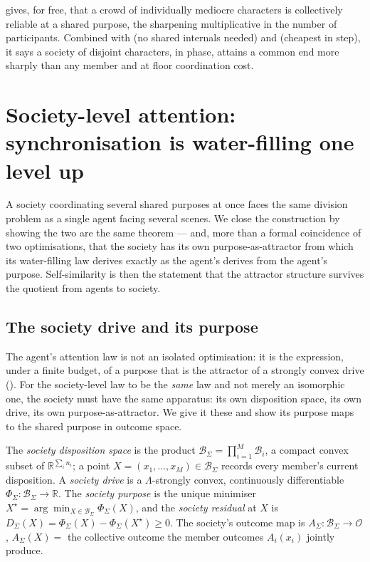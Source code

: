 \documentclass[11pt,twocolumn,a4paper]{article}
\newcommand{\R}{\mathbb{R}}
\newcommand{\Beh}{\mathcal{B}}       %
\newcommand{\drive}{\Phi}            %
\newcommand{\Soc}{\Sigma}            %
\newcommand{\Out}{\mathcal{O}}       %
\begin{document}
\begin{remark}
\label{rem:emergent}
 gives, for free, that a crowd of individually mediocre
characters is collectively reliable at a shared purpose, the sharpening
multiplicative in the number of participants. Combined with
 (no shared internals needed) and 
(cheapest in step), it says a society of disjoint characters, in phase,
attains a common end more sharply than any member and at floor
coordination cost.
\end{remark}

\section{Society-level attention: synchronisation is water-filling one
level up}
\label{sec:society-attention}

A society coordinating several shared purposes at once faces the same
division problem as a single agent facing several scenes. We close the
construction by showing the two are the same theorem --- and, more than a
formal coincidence of two optimisations, that the society has its own
purpose-as-attractor from which its water-filling law derives exactly as
the agent's derives from the agent's purpose. Self-similarity is then the
statement that the attractor structure survives the quotient from agents to
society.

\subsection{The society drive and its purpose}
\label{sec:society-drive}

The agent's attention law is not an isolated optimisation: it is the
expression, under a finite budget, of a purpose that is the attractor of a
strongly convex drive (). For the society-level law to be
the \emph{same} law and not merely an isomorphic one, the society must have
the same apparatus: its own disposition space, its own drive, its own
purpose-as-attractor. We give it these and show its purpose maps to the
shared purpose in outcome space.

\begin{definition}
\label{def:society-drive}
The \emph{society disposition space} is the product
$\Beh_\Soc=\prod_{i=1}^M\Beh_i$, a compact convex subset of
$\R^{\sum_i n_i}$; a point $X=(x_1,\dots,x_M)\in\Beh_\Soc$ records every
member's current disposition. A \emph{society drive} is a
$\Lambda$-strongly convex, continuously differentiable
$\drive_\Soc:\Beh_\Soc\to\R$. The \emph{society purpose} is the unique
minimiser $X^\star=\arg\min_{X\in\Beh_\Soc}\drive_\Soc(X)$, and the
\emph{society residual} at $X$ is
$D_\Soc(X)=\drive_\Soc(X)-\drive_\Soc(X^\star)\ge0$. The society's outcome
map is $A_\Soc:\Beh_\Soc\to\Out$, $A_\Soc(X)=$ the collective outcome the
member outcomes $A_i(x_i)$ jointly produce.
\end{definition}
\end{document}
